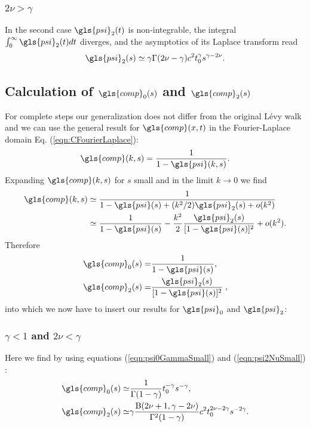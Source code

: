\subsubsection*{$2\nu>\gamma$} 
In the second case $\gls{psi}_2(t)$ is non-integrable, the integral $\int_0^\infty \gls{psi}_2(t) dt$ diverges, and the asymptotics of its Laplace transform read
\begin{align}
 \gls{psi}_2(s) \simeq \gamma \Gamma(2\nu-\gamma) c^2  t_0^\gamma s^{\gamma-2\nu}. \label{eqn:psi2NuBig}
\end{align}

\subsection*{Calculation of $\gls{comp}_0(s)$ and $\gls{comp}_2(s)$}

For complete steps our generalization does not differ from the original L\'evy walk and we can use the general result for $\gls{comp}(x,t)$ in the Fourier-Laplace domain Eq. (\ref{eqn:CFourierLaplace}):
%
\begin{align}
\gls{comp}(k,s) = \frac{1}{1 - \gls{psi}(k,s)}.
\end{align}
%
Expanding $\gls{comp}(k,s)$ for $s$ small and in the limit $k \to 0$ we find 
%
\begin{align}
\begin{split}
\gls{comp}(k,s)  &\simeq \frac{1}{1 - \gls{psi}(s) + (k^2/2) \gls{psi}_2(s) +o(k^2)}\\ &\simeq \frac{1}{1-\gls{psi}(s)} - \frac{k^2}{2}  \frac{\gls{psi}_2(s)}{[1-\gls{psi}(s)]^2} + o(k^2).
\end{split}
\end{align}
Therefore 
\begin{align}
\gls{comp}_0(s) =& \frac{1}{1-\gls{psi}(s)} , \\
\gls{comp}_2(s) =& \frac{\gls{psi}_2(s)}{[1-\gls{psi}(s)]^2} \;,
\end{align}
into which we now have to insert our results for $\gls{psi}_0$ and $\gls{psi}_2$:

\subsubsection{$\gamma<1$ and $2\nu<\gamma$ }
Here we find by using equations (\ref{eqn:psi0GammaSmall}) and (\ref{eqn:psi2NuSmall}) :
\begin{align}
 \gls{comp}_0(s) \simeq & \frac{1}{\Gamma(1-\gamma)} t_0^{-\gamma} s^{-\gamma}, \label{eq:Co}\\
 \gls{comp}_2(s) \simeq & \gamma   \frac{ \mathrm{B}(2\nu+1,\gamma-2\nu)}{\Gamma^2(1-\gamma)} c^2 t_0^{2\nu - 2\gamma} s^{-2 \gamma} .
\end{align}

